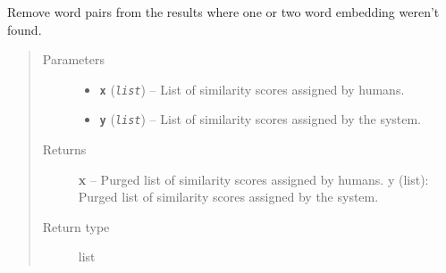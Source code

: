 \documentclass[letterpaper,10pt,english]{sphinxmanual}
\begin{document}
\begin{fulllineitems}
\label{src.eval:src.eval.word_similarity.remove_unknowns}
Remove word pairs from the results where one or two word embedding weren't found.
\begin{quote}\begin{description}
\item[{Parameters}] \leavevmode\begin{itemize}
\item {} 
\textbf{\texttt{x}} (\emph{\texttt{list}}) -- List of similarity scores assigned by humans.

\item {} 
\textbf{\texttt{y}} (\emph{\texttt{list}}) -- List of similarity scores assigned by the system.

\end{itemize}

\item[{Returns}] \leavevmode
\textbf{x} -- Purged list of similarity scores assigned by humans.
y (list): Purged list of similarity scores assigned by the system.

\item[{Return type}] \leavevmode
list

\end{description}\end{quote}

\end{fulllineitems}

\end{document}
